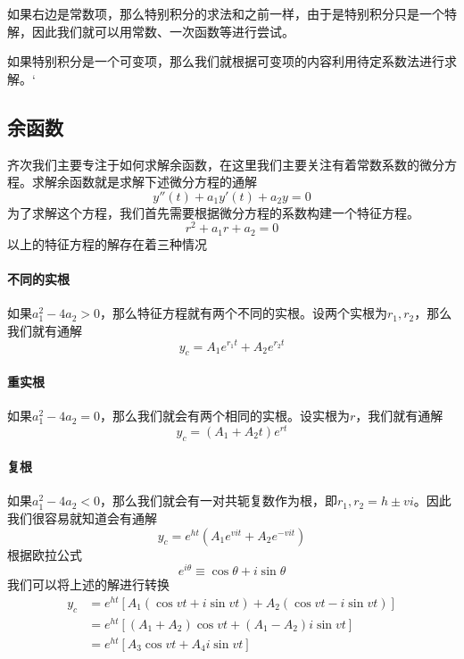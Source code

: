 \documentclass[UTF8,12pt]{ctexart}
\numberwithin{equation}{section} %
\numberwithin{figure}{section}
\numberwithin{table}{section}
\begin{document}
	如果右边是常数项，那么特别积分的求法和之前一样，由于是特别积分只是一个特解，因此我们就可以用常数、一次函数等进行尝试。
	
	如果特别积分是一个可变项，那么我们就根据可变项的内容利用待定系数法进行求解。`
	
	\subsection{余函数}
	齐次我们主要专注于如何求解余函数，在这里我们主要关注有着常数系数的微分方程。求解余函数就是求解下述微分方程的通解
	\begin{equation}
		y''(t) + a_1 y'(t) + a_2 y = 0
	\end{equation}
	为了求解这个方程，我们首先需要根据微分方程的系数构建一个特征方程。
	\begin{equation}
		r^2 + a_1 r + a_2 = 0
	\end{equation}
	以上的特征方程的解存在着三种情况
	\paragraph{不同的实根} 如果$a_1^2 - 4a_2 > 0$，那么特征方程就有两个不同的实根。设两个实根为$r_1,r_2$，那么我们就有通解
	\begin{equation}
		y_c = A_1e^{r_1t} + A_2e^{r_2t}
	\end{equation}

	\paragraph{重实根} 如果$a_1^2 - 4a_2 = 0$，那么我们就会有两个相同的实根。设实根为$r$，我们就有通解
	\begin{equation}
		y_c = (A_1 + A_2 t)e^{rt}
	\end{equation}
	
	\paragraph{复根} 如果$a_1^2 - 4a_2 < 0$，那么我们就会有一对共轭复数作为根，即$r_1,r_2 = h \pm vi$。因此我们很容易就知道会有通解
	\begin{equation}
		y_c = e^{ht}(A_1e^{vit} + A_2e^{-vit})
	\end{equation}
	根据欧拉公式
	\begin{equation}
		e^{i\theta} \equiv \cos\theta + i \sin\theta
	\end{equation}
	我们可以将上述的解进行转换
	\begin{equation}
		\begin{aligned}
			y_c 
			&= e^{ht}[A_1( \cos vt + i \sin vt) + A_2(\cos vt - i \sin vt)]  \\
			&= e^{ht}[(A_1 + A_2)\cos vt +(A_1 - A_2) i \sin vt] \\
			&= e^{ht}[A_3\cos vt +A_4 i \sin vt]
		\end{aligned}
	\end{equation}
	
\end{document}
